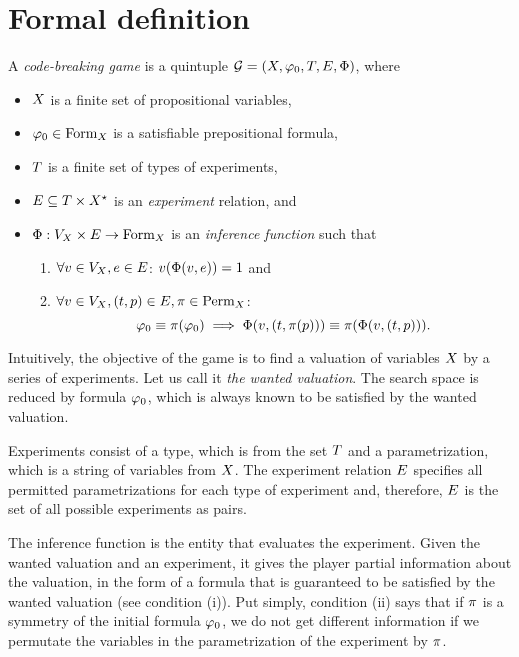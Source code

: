 \section{Formal definition}
\begin{definition} \label{def-game}
A \emph{code-breaking game} is a quintuple
  $\mathcal{G} = (X, \varphi_0, T, E, \Phi)$, where
  \begin{itemize}
  \item $X$ is a finite set of propositional variables,
  \item $\varphi_0 \in \textrm{Form}_X$ is a satisfiable prepositional formula,
  \item $T$ is a finite set of types of experiments,
  \item $E \subseteq T \times X^\star$ is an \emph{experiment} relation,
  and
  \item $\Phi: V_X \times E -> \textrm{Form}_X$ is an
  \emph{inference function} such that
    \begin{enumerate}[label=(\roman*)]
    \item $\forall v\in V_X, e\in E$:
      $v(\Phi(v, e)) = 1$ and
    \item $\forall v\in V_X, (t, p)\in E, \pi\in \textrm{Perm}_X$:
        \[
        \varphi_0 \equiv \pi(\varphi_0) \;==>\;
          \Phi(v, (t, \pi(p)))
          \equiv
          \pi(\Phi(v, (t, p))).
        \]
    \end{enumerate}
 \end{itemize}
\end{definition}

Intuitively, the objective of the game is to find a valuation of
  variables $X$ by a series of experiments.
Let us call it \emph{the wanted valuation}.
The search space is reduced by formula $\varphi_0$,
  which is always known to be satisfied by the wanted valuation.

Experiments consist of a type, which is from the set $T$ and a
  parametrization, which is a string of variables from $X$.
The experiment relation $E$ specifies all permitted parametrizations
  for each type of experiment and, therefore, $E$ is the set of
  all possible experiments as pairs.

The inference function is the entity that evaluates the experiment.
Given the wanted valuation and an experiment, it gives the player
  partial information about the valuation,
  in the form of a formula that is guaranteed
  to be satisfied by the wanted valuation (see condition (i)).
Put simply, condition (ii) says that if $\pi$ is a symmetry
  of the initial formula $\varphi_0$, we do not get different information
  if we permutate the variables in the parametrization of the experiment
  by $\pi$.

